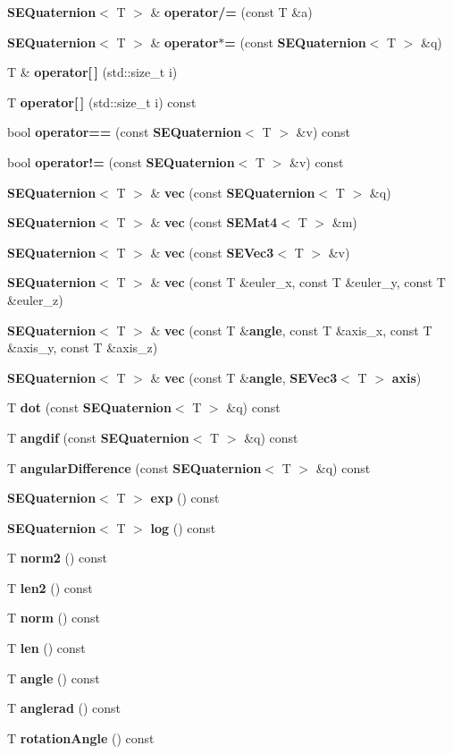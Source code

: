 \begin{DoxyCompactItemize}
{\bf S\+E\+Quaternion}$<$ T $>$ \& {\bf operator/=} (const T \&a)
\item 
{\bf S\+E\+Quaternion}$<$ T $>$ \& {\bf operator$\ast$=} (const {\bf S\+E\+Quaternion}$<$ T $>$ \&q)
\item 
T \& {\bf operator[$\,$]} (std\+::size\+\_\+t i)
\item 
T {\bf operator[$\,$]} (std\+::size\+\_\+t i) const 
\item 
bool {\bf operator==} (const {\bf S\+E\+Quaternion}$<$ T $>$ \&v) const 
\item 
bool {\bf operator!=} (const {\bf S\+E\+Quaternion}$<$ T $>$ \&v) const 
\item 
{\bf S\+E\+Quaternion}$<$ T $>$ \& {\bf vec} (const {\bf S\+E\+Quaternion}$<$ T $>$ \&q)
\item 
{\bf S\+E\+Quaternion}$<$ T $>$ \& {\bf vec} (const {\bf S\+E\+Mat4}$<$ T $>$ \&m)
\item 
{\bf S\+E\+Quaternion}$<$ T $>$ \& {\bf vec} (const {\bf S\+E\+Vec3}$<$ T $>$ \&v)
\item 
{\bf S\+E\+Quaternion}$<$ T $>$ \& {\bf vec} (const T \&euler\+\_\+x, const T \&euler\+\_\+y, const T \&euler\+\_\+z)
\item 
{\bf S\+E\+Quaternion}$<$ T $>$ \& {\bf vec} (const T \&{\bf angle}, const T \&axis\+\_\+x, const T \&axis\+\_\+y, const T \&axis\+\_\+z)
\item 
{\bf S\+E\+Quaternion}$<$ T $>$ \& {\bf vec} (const T \&{\bf angle}, {\bf S\+E\+Vec3}$<$ T $>$ {\bf axis})
\item 
T {\bf dot} (const {\bf S\+E\+Quaternion}$<$ T $>$ \&q) const 
\item 
T {\bf angdif} (const {\bf S\+E\+Quaternion}$<$ T $>$ \&q) const 
\item 
T {\bf angular\+Difference} (const {\bf S\+E\+Quaternion}$<$ T $>$ \&q) const 
\item 
{\bf S\+E\+Quaternion}$<$ T $>$ {\bf exp} () const 
\item 
{\bf S\+E\+Quaternion}$<$ T $>$ {\bf log} () const 
\item 
T {\bf norm2} () const 
\item 
T {\bf len2} () const 
\item 
T {\bf norm} () const 
\item 
T {\bf len} () const 
\item 
T {\bf angle} () const 
\item 
T {\bf anglerad} () const 
\item 
T {\bf rotation\+Angle} () const 

\end{DoxyCompactItemize}
